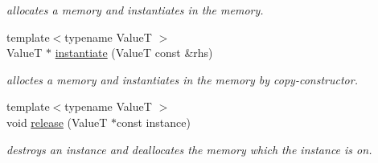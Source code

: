 \begin{DoxyCompactItemize}
\begin{DoxyCompactList}\small\item\em allocates a memory and instantiates in the memory. \end{DoxyCompactList}\item 
\hypertarget{classhryky_1_1memory_1_1heap_1_1_base_a7faca1782110d1dc7089caaede624444}{{\footnotesize template$<$typename Value\-T $>$ }\\Value\-T $\ast$ \hyperlink{classhryky_1_1memory_1_1heap_1_1_base_a7faca1782110d1dc7089caaede624444}{instantiate} (Value\-T const \&rhs)}\label{classhryky_1_1memory_1_1heap_1_1_base_a7faca1782110d1dc7089caaede624444}

\begin{DoxyCompactList}\small\item\em alloctes a memory and instantiates in the memory by copy-\/constructor. \end{DoxyCompactList}\item 
\hypertarget{classhryky_1_1memory_1_1heap_1_1_base_a03d3126311af90ea5c9807425fb971a6}{{\footnotesize template$<$typename Value\-T $>$ }\\void \hyperlink{classhryky_1_1memory_1_1heap_1_1_base_a03d3126311af90ea5c9807425fb971a6}{release} (Value\-T $\ast$const instance)}\label{classhryky_1_1memory_1_1heap_1_1_base_a03d3126311af90ea5c9807425fb971a6}

\begin{DoxyCompactList}\small\item\em destroys an instance and deallocates the memory which the instance is on. \end{DoxyCompactList}\end{DoxyCompactItemize}
